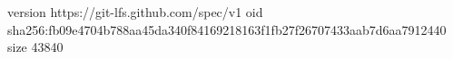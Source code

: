 version https://git-lfs.github.com/spec/v1
oid sha256:fb09e4704b788aa45da340f84169218163f1fb27f26707433aab7d6aa7912440
size 43840

